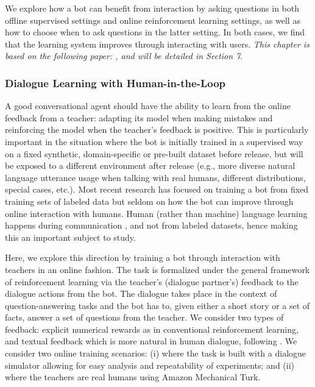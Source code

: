 We explore how
a bot can benefit from interaction by asking questions in both offline supervised settings and online
reinforcement learning settings, as well as how to choose when to ask questions in the latter setting.
In both cases, we find that the learning system improves through interacting with users.
{\it This chapter is based on the following paper: , and will be detailed in Section 7}. 

   \subsubsection*{Dialogue Learning with Human-in-the-Loop}
  A good conversational agent  
should have the ability to learn from the online feedback from a teacher: adapting its model when making mistakes and reinforcing the model when the teacher's feedback is positive.
This is particularly important in the situation where the bot is initially trained in a supervised way on a fixed synthetic, domain-specific or pre-built dataset before release, but will be exposed to
a different environment after release
 (e.g.,
 more diverse natural language utterance usage when talking with real humans, different distributions, special cases, etc.).  Most recent research
has focused on training a bot
from fixed training sets of labeled data but seldom on how the bot can
improve through online interaction with humans.
Human (rather than machine) language learning happens during communication \citep{bassiri2011interactional,werts1995instructive},
and not from labeled datasets, hence making this an important subject to study.


Here, we explore this direction by
 training a bot through interaction with teachers in an online fashion.
 The task is formalized under the general framework of reinforcement learning
via the teacher's (dialogue partner's) feedback to the dialogue actions from the bot.
 The dialogue takes place in the context of question-answering tasks and the bot has to, given either a short story or a set of facts, answer a set of questions from the teacher.
We consider two types of feedback: explicit numerical rewards as in conventional
reinforcement learning, and textual feedback which is more natural in human dialogue, following
\citep{weston2016dialog}.
We consider two online training scenarios:
(i) where the task is built with a dialogue simulator allowing for easy analysis and repeatability
of experiments; and (ii) where the teachers are real humans using Amazon Mechanical Turk.

